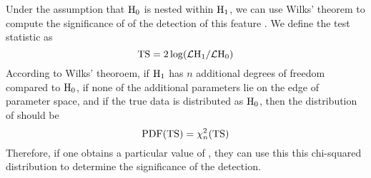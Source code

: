 Under the assumption that $\text{H}_0$ is nested within $\text{H}_1$,
we can use Wilks' theorem to compute the significance of
of the detection of this feature \citep{wilks_1938a_large-sample-distribution}.
We define the test statistic as
\begin{equation}
  \mathrm{TS} = 2\log(\mathcal{L}\text{H}_1/\mathcal{L}\text{H}_0)
\end{equation}
According to Wilks' theoroem, if $\text{H}_1$ has $n$ additional
degrees of freedom compared to $\text{H}_0$, if none of the additional
parameters lie on the edge of parameter space, and if the true data is
distributed as $\text{H}_0$, then the distribution of \ts should be
\begin{equation}
  \text{PDF}(\mathrm{TS}) = \chi^2_n(\mathrm{TS})
\end{equation}
Therefore, if one obtains a particular value of \ts, they can use
this this chi-squared distribution to determine the significance of
the detection.
